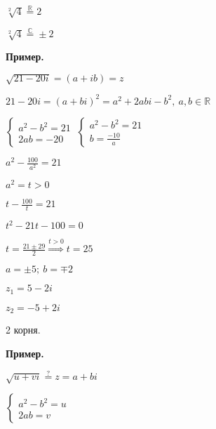 \documentclass{article}
\begin{document}
    \( \sqrt[2]{4} \stackrel{\mathbb{R}}{=} 2 \)
    
    \( \sqrt[2]{4} \stackrel{\mathbb{C}}{=} \pm 2 \)

    \textbf{Пример.}

    \(\sqrt{21-20i} = (a+ib) = z\)

    \(21-20i = (a+bi)^2 = a^2 + 2abi - b^2,\ a, b \in \mathbb{R}\)

    \(\begin{cases}
        a^2-b^2 = 21\\
        2ab = -20
    \end{cases}\ 
    \begin{cases}
        a^2-b^2 = 21\\
        b = \frac{-10}{a}
    \end{cases}\)

    \(a^2-\frac{100}{a^2} = 21\)

    \(a^2=t>0\)
    
    \(t-\frac{100}{t} = 21\)

    \(t^2-21t-100 = 0\)
    
    \(t = \frac{21\pm29}{2} \stackrel{t>0}{\Rightarrow} t = 25\)
    
    \(a = \pm 5;\ b = \mp 2\)
    
    \( z_1 = 5 - 2i \)
    
    \( z_2 = -5 + 2i \)

    2 корня. 

    \textbf{Пример.}

    \( \sqrt{u + vi} \stackrel{?}{=} z = a + bi \)

    \( \begin{cases}
        a^2 - b^2 = u\\
        2ab = v
    \end{cases} \)
\end{document}
